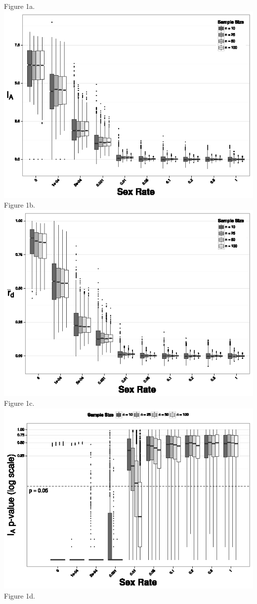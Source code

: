 \documentclass[letterpaper, 10pt]{article}
\begin{document}
\begin{center}
Figure 1a.\\
\includegraphics{figures/Ia_chart.eps}\\Figure 1b.\\
\includegraphics{figures/rbarD_chart.eps}\\Figure 1c.\\
\includegraphics{figures/Ia_pval.eps}\\Figure 1d.\\

\end{center}
\end{document}
